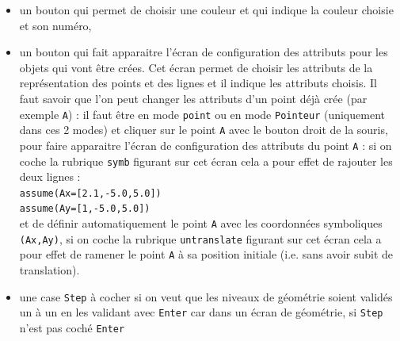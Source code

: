 \documentclass[a4paper,11pt]{article}
\begin{document}
\begin{itemize}
\begin{itemize}
\begin{itemize}
seront pr\'ec\'ed\'ees d'une l\'egende sauf si on a choisi une commande se 
terminant par {\tt brut}. {\bf Attention !} pour pouvoir d\'esigner \`a la 
souris un objet g\'eom\'etrique qui n'est pas un point, il faut que cet objet 
ait un nom. 
\item {\tt Intersection} pour avoir l'intersection ou les intersections de deux
courbes. {\bf Attention !} pour pouvoir d\'esigner \`a la souris un objet
g\'eom\'etrique qui n'est pas un point, il faut que cet objet ait un nom. 
\item {\tt tangent} pour dessiner les tangentes \`a une courbe passant par un 
point.
\end{itemize}
\item un bouton qui permet de choisir une couleur et qui indique la couleur 
choisie et son num\'ero, 
\item un bouton qui fait apparaitre l'\'ecran de configuration des attributs
pour les objets qui vont \^etre cr\'ees. Cet \'ecran permet de choisir les 
attributs de la repr\'esentation des points et des lignes et il indique les
attributs choisis. 
Il faut savoir que l'on peut changer les attributs \label{sec:symb}
d'un point d\'ej\`a cr\'ee (par exemple {\tt A}) : il faut \^etre 
 en mode {\tt point} ou en  mode {\tt Pointeur} (uniquement dans 
ces 2  modes) et cliquer sur le point {\tt A} avec le  bouton droit 
de la souris, pour faire apparaitre l'\'ecran de configuration des attributs du
point {\tt A} : si on coche la rubrique {\tt symb} figurant sur cet \'ecran
cela a pour effet de rajouter les deux lignes :\\
 {\tt assume(Ax=[2.1,-5.0,5.0])}\\
 {\tt assume(Ay=[1,-5.0,5.0])}\\
et de d\'efinir automatiquement le point  {\tt A} avec les coordonn\'ees 
symboliques {\tt (Ax,Ay)}, si on coche la rubrique {\tt untranslate} figurant 
sur cet \'ecran cela a pour effet de ramener le point {\tt A} \`a sa position 
initiale (i.e. sans avoir subit de translation).
\item une case {\tt Step} \`a cocher si on veut que les niveaux de 
g\'eom\'etrie soient valid\'es un \`a un en les validant avec {\tt Enter} car 
dans un \'ecran de g\'eom\'etrie, si {\tt Step} n'est pas coch\'e {\tt Enter} 

\end{itemize}
\end{itemize}
\end{document}
